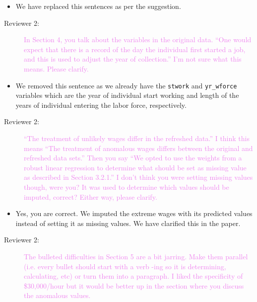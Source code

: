 \documentclass[12pt,a4paper,]{article}
\providecommand{\tightlist}{%
  \setlength{\itemsep}{0pt}\setlength{\parskip}{0pt}}
\begin{document}
\begin{itemize}
\tightlist
\item
  We have replaced this sentences as per the suggestion.
\end{itemize}

\begin{description}
\item[Reviewer 2:]\textcolor{violet}{In Section 4, you talk about the variables in the original data. “One would expect that there is a record of the day the individual first started a job, and this is used to adjust the year of collection.” I’m not sure what this means. Please clarify.}
\end{description}

\begin{itemize}
\tightlist
\item
  We removed this sentence as we already have the \texttt{stwork} and \texttt{yr\_wforce} variables which are the year of individual start working and length of the years of individual entering the labor force, respectively.
\end{itemize}

\begin{description}
\item[Reviewer 2:]\textcolor{violet}{“The treatment of unlikely wages differ in the refreshed data.” I think this means “The treatment of anomalous wages differs between the original and refreshed data sets.” Then you say “We opted to use the weights from a robust linear regression to determine what should be set as missing value as described in Section 3.2.1.” I don’t think you were setting missing values though, were you? It was used to determine which values should be imputed, correct? Either way, please clarify.}
\end{description}

\begin{itemize}
\tightlist
\item
  Yes, you are correct. We imputed the extreme wages with its predicted values instead of setting it as missing values. We have clarified this in the paper.
\end{itemize}

\begin{description}
\item[Reviewer 2:]\textcolor{violet}{The bulleted difficulties in Section 5 are a bit jarring. Make them parallel (i.e. every bullet should start with a verb -ing so it is determining, calculating, etc) or turn them into a paragraph. I liked the specificity of \$30,000/hour but it would be better up in the section where you discuss the anomalous values.}
\end{description}
\end{document}
